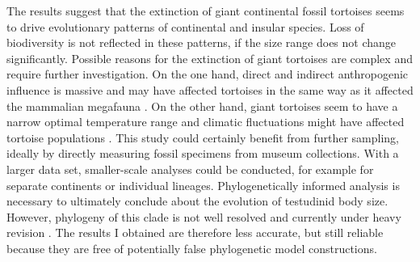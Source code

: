 The results suggest that the extinction of giant continental fossil tortoises seems to drive evolutionary patterns of continental and insular species. Loss of biodiversity is not reflected in these patterns, if the size range does not change significantly.
Possible reasons for the extinction of giant tortoises are complex and require further investigation. On the one hand, direct and indirect anthropogenic influence is massive and may have affected tortoises in the same way as it affected the mammalian megafauna \citep{Barnosky2004,Sandom2014}. On the other hand, giant tortoises seem to have a narrow optimal temperature range and climatic fluctuations might have affected tortoise populations \citep{Cione2003}.
This study could certainly benefit from further sampling, ideally by directly measuring fossil specimens from museum collections.
With a larger data set, smaller-scale analyses could be conducted, for example for separate continents or individual lineages.
Phylogenetically informed analysis is necessary to ultimately conclude about the evolution of testudinid body size. However, phylogeny of this clade is not well resolved and currently under heavy revision \citep{.}. The results I obtained are therefore less accurate, but still reliable because they are free of potentially false phylogenetic model constructions.







